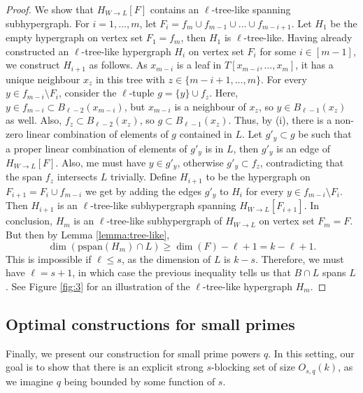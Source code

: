\documentclass[11pt]{article}
\theoremstyle{plain}
\theoremstyle{definition}
\begin{document}
\begin{proof}
We show that   $H_{W\rightarrow L}[F]$ contains an $\ell$-tree-like spanning subhypergraph. For $i=1,\dots,m$, let $F_i=f_m\cup f_{m-1}\cup\dots\cup f_{m-i+1}$. Let $H_1$ be the empty hypergraph on vertex set $F_1=f_m$, then $H_1$ is $\ell$-tree-like. Having already constructed an $\ell$-tree-like hypergraph $H_i$ on vertex set $F_i$ for some $i\in [m-1]$, we construct $H_{i+1}$ as follows. As $x_{m-i}$ is a leaf in $T[x_{m-i},\dots,x_{m}]$, it has a unique neighbour $x_z$ in this tree with $z\in \{m-i+1,\dots,m\}$. For every $y\in f_{m-i}\setminus F_i$, consider the $\ell$-tuple $g=\{y\}\cup f_{z}$. Here, $y\in f_{m-i}\subset B_{\ell-2}(x_{m-i})$, but $x_{m-i}$ is a neighbour of $x_{z}$, so $y\in B_{\ell-1}(x_{z})$ as well. Also, $f_{z}\subset B_{\ell-2}(x_{z})$, so $g\subset B_{\ell-1}(x_{z})$. Thus, by (i), there is a non-zero linear combination of elements of $g$ contained in $L$. Let $g'_y\subset g$ be such that a proper linear combination of elements of $g'_y$ is in $L$, then $g'_y$ is an edge of $H_{W\rightarrow L}[F]$. Also, me must have $y\in g'_y$, otherwise $g'_y\subset f_{z}$, contradicting that the span $f_{z}$ intersects $L$ trivially. Define $H_{i+1}$ to be the hypergraph on $F_{i+1}=F_i\cup f_{m-i}$ we get by adding the edges $g'_y$ to $H_i$ for every $y\in f_{m-i}\setminus F_i$. Then $H_{i+1}$ is an $\ell$-tree-like subhypergraph spanning $H_{W\rightarrow L}[F_{i+1}]$. In conclusion, $H_m$ is an $\ell$-tree-like subhypergraph of $H_{W\rightarrow L}$ on vertex set $F_m=F$. But then by Lemma \ref{lemma:tree-like}, 
$$\dim(\mbox{pspan}(H_m)\cap L)\geq \dim(F)-\ell+1=k-\ell+1.$$
This is impossible if $\ell\leq s$, as the dimension of $L$ is $k-s$. Therefore, we must have $\ell=s+1$, in which case the previous inequality tells us that $B\cap L$ spans $L$. See Figure \ref{fig:3} for an illustration of the $\ell$-tree-like hypergraph $H_m$.
\end{proof}

\subsection{Optimal constructions for small primes}\label{sect:small_prime}

Finally, we present our construction for small prime powers $q$. In this setting, our goal is to show that there is an explicit strong $s$-blocking set of size $O_{s,q}(k)$, as we imagine $q$ being bounded by some function of $s$.

\medskip
\end{document}
